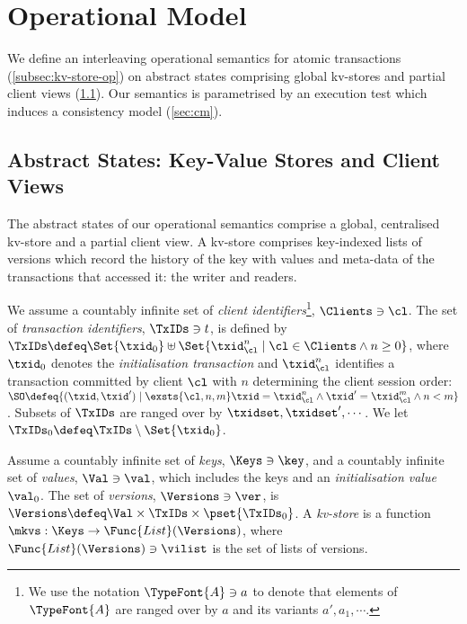 \section{Operational Model}
\label{sec:model}

We define an interleaving operational semantics for atomic transactions (\cref{subsec:kv-store-op}) on
abstract states comprising global kv-stores and partial client views (\cref{subsec:kvstores}). 
Our semantics is parametrised by an execution test which induces a
consistency model  (\cref{sec:cm}).

\subsection{Abstract States: Key-Value Stores and Client Views}
\label{subsec:kvstores}
\label{sec:mkvs-view}
The abstract states of our operational semantics comprise 
a  global, centralised kv-store and a partial client view.  A
kv-store comprises key-indexed lists of versions which record
the history of the key with values and meta-data of the
transactions that accessed it: the writer and readers.

We assume a countably infinite set of \emph{client identifiers}\footnote{ We use the notation
 \(\TypeFont{A} \ni a\) to denote that elements of \(\TypeFont{A}\) are ranged over
  by \(a\) and its variants \(a', a_1, \cdots\).},
\(\Clients \ni \cl\).
The set of \emph{transaction identifiers}, \(\TxIDs \ni t\), 
 is defined by
\(\TxIDs \defeq  \Set{\txid_{0}} \uplus \Set{ \txid_{\cl}^{n} \mid \cl \in \Clients \land n \geq 0 }\), 
where  \(\txid_0\) denotes  the  \emph{initialisation transaction}
and \(\txid_{\cl}^{n}\) identifies a transaction committed by client
\(\cl\) with \(n\)  determining  the client session order:
\(\SO \defeq \{ (\txid, \txid') \mid \exsts{ \cl, n,m } \txid = \txid_{\cl}^{n} \land \allowbreak \txid' = \txid_{\cl}^{m} \land \allowbreak n < m\}\).
Subsets of \(\TxIDs\)  are ranged over by \(\txidset, \txidset', \cdots\). 
We let \(\TxIDs_{0} \defeq \TxIDs \setminus \Set{\txid_0}\). 

\SpaceAboveDef
\begin{definition}[Kv-stores]
\label{def:his_heap}
\label{def:mkvs}
Assume a countably infinite set of \emph{keys}, \(\Keys \ni \key\), 
and a countably infinite set of  \emph{values}, \(\Val \ni \val\), 
which includes the keys and an \emph{initialisation value} \(\val_0\).
The set of \emph{versions}, \(\Versions \ni \ver\), is \(\Versions \defeq \Val \times \TxIDs \times \pset{\TxIDs_{0}}\). 
A \emph{kv-store} 
is a function \(\mkvs: \Keys \to \Func{List}(\Versions)\), 
where \(\Func{List}(\Versions) \ni \vilist\) is the set of lists of versions.
\end{definition}
\SpaceBelowDef

